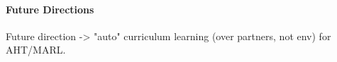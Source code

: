 \paragraph{Future Directions}
Future direction -> "auto" curriculum learning (over partners, not env) for AHT/MARL.